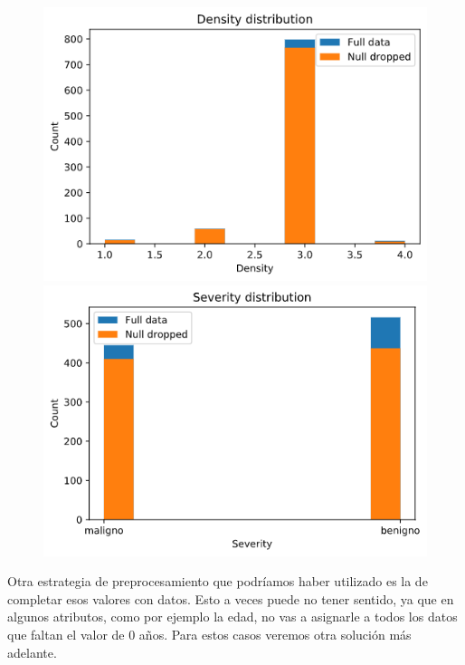 \documentclass[11pt,a4paper]{article}
\begin{document}
    
\begin{figure}[H]
    \centering
    
    \begin{minipage}{0.5\textwidth}
        \centering
        \includegraphics[scale=0.35]{img/density-distribution.png}
    \end{minipage}%
    \begin{minipage}{0.5\textwidth}
        \centering
        \includegraphics[scale=0.35]{img/severity-distribution.png}
    \end{minipage}
    
\end{figure}
    
Otra estrategia de preprocesamiento que podríamos haber utilizado es la de completar esos valores con datos. Esto a veces puede
no tener sentido, ya que en algunos atributos, como por ejemplo la edad, no vas a asignarle a todos los datos que faltan el valor
de 0 años. Para estos casos veremos otra solución más adelante.
\end{document}
